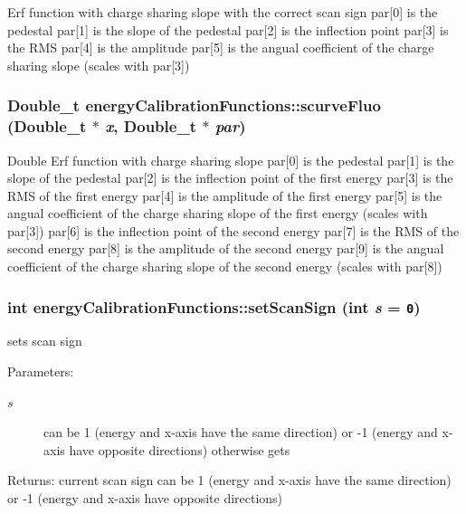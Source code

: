 Erf function with charge sharing slope with the correct scan sign par[0] is the pedestal par[1] is the slope of the pedestal par[2] is the inflection point par[3] is the RMS par[4] is the amplitude par[5] is the angual coefficient of the charge sharing slope (scales with par[3]) 
\subsubsection{\setlength{\rightskip}{0pt plus 5cm}Double\_\-t energy\-Calibration\-Functions::scurve\-Fluo (Double\_\-t $\ast$ {\em x}, Double\_\-t $\ast$ {\em par})}\label{classenergyCalibrationFunctions_4eba39623b518d67a63192970a78f530}


Double Erf function with charge sharing slope par[0] is the pedestal par[1] is the slope of the pedestal par[2] is the inflection point of the first energy par[3] is the RMS of the first energy par[4] is the amplitude of the first energy par[5] is the angual coefficient of the charge sharing slope of the first energy (scales with par[3]) par[6] is the inflection point of the second energy par[7] is the RMS of the second energy par[8] is the amplitude of the second energy par[9] is the angual coefficient of the charge sharing slope of the second energy (scales with par[8]) 
\subsubsection{\setlength{\rightskip}{0pt plus 5cm}int energy\-Calibration\-Functions::set\-Scan\-Sign (int {\em s} = {\tt 0})\hspace{0.3cm}{\tt  [inline]}}\label{classenergyCalibrationFunctions_716759a1ae09ea3c841f824af3ece415}


sets scan sign \begin{Desc}
\item[Parameters:]
\begin{description}
\item[{\em s}]can be 1 (energy and x-axis have the same direction) or -1 (energy and x-axis have opposite directions) otherwise gets \end{description}
\end{Desc}
\begin{Desc}
\item[Returns:]current scan sign can be 1 (energy and x-axis have the same direction) or -1 (energy and x-axis have opposite directions) \end{Desc}
